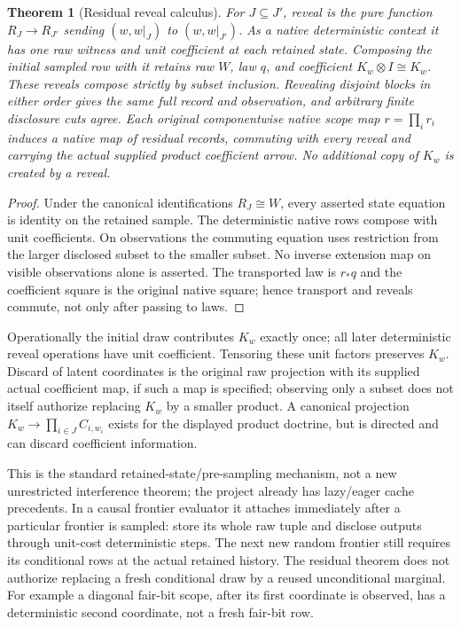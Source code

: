 \documentclass[11pt]{article}
\newtheorem{theorem}{Theorem}\newtheorem{proposition}[theorem]{Proposition}\newtheorem{definition}[theorem]{Definition}
\begin{document}
\begin{theorem}[Residual reveal calculus]
For $J\subseteq J'$, reveal is the pure function $R_J\to R_{J'}$ sending $(w,w|_J)$ to $(w,w|_{J'})$. As a native deterministic context it has one raw witness and unit coefficient at each retained state. Composing the initial sampled row with it retains raw $W$, law $q$, and coefficient $K_w\otimes I\cong K_w$. These reveals compose strictly by subset inclusion. Revealing disjoint blocks in either order gives the same full record and observation, and arbitrary finite disclosure cuts agree. Each original componentwise native scope map $r=\prod_i r_i$ induces a native map of residual records, commuting with every reveal and carrying the actual supplied product coefficient arrow. No additional copy of $K_w$ is created by a reveal.
\end{theorem}
\begin{proof}
Under the canonical identifications $R_J\cong W$, every asserted state equation is identity on the retained sample. The deterministic native rows compose with unit coefficients. On observations the commuting equation uses restriction from the larger disclosed subset to the smaller subset. No inverse extension map on visible observations alone is asserted. The transported law is $r_*q$ and the coefficient square is the original native square; hence transport and reveals commute, not only after passing to laws.\end{proof}
Operationally the initial draw contributes $K_w$ exactly once; all later deterministic reveal operations have unit coefficient. Tensoring these unit factors preserves $K_w$. Discard of latent coordinates is the original raw projection with its supplied actual coefficient map, if such a map is specified; observing only a subset does not itself authorize replacing $K_w$ by a smaller product. A canonical projection $K_w\to\prod_{i\in J}C_{i,w_i}$ exists for the displayed product doctrine, but is directed and can discard coefficient information.

This is the standard retained-state/pre-sampling mechanism, not a new unrestricted interference theorem; the project already has lazy/eager cache precedents. In a causal frontier evaluator it attaches immediately after a particular frontier is sampled: store its whole raw tuple and disclose outputs through unit-cost deterministic steps. The next new random frontier still requires its conditional rows at the actual retained history. The residual theorem does not authorize replacing a fresh conditional draw by a reused unconditional marginal. For example a diagonal fair-bit scope, after its first coordinate is observed, has a deterministic second coordinate, not a fresh fair-bit row.
\end{document}

